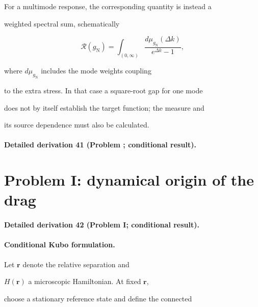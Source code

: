 For a multimode response, the corresponding quantity is instead a

weighted spectral sum, schematically

\[

\mathcal R(g_{\mathrm N})

=

\int_{(0,\infty)}

\frac{d\mu_{g_{\mathrm N}}(\Delta k)}

     {e^{\Delta k}-1},

\]

where \(d\mu_{g_{\mathrm N}}\) includes the mode weights coupling

to the extra stress. In that case a square-root gap for one mode

does not by itself establish the target function; the measure and

its source dependence must also be calculated.



\paragraph{Detailed derivation 41 (Problem ; conditional result).} \label{ref:detail-40} %



\section{Problem I: dynamical origin of the drag}

\label{sec:status-I}



\paragraph{Detailed derivation 42 (Problem I; conditional result).} \label{ref:detail-41} %



\paragraph{Conditional Kubo formulation.}

Let \(\mathbf r\) denote the relative separation and

\(H(\mathbf r)\) a microscopic Hamiltonian. At fixed \(\mathbf r\),

choose a stationary reference state and define the connected

